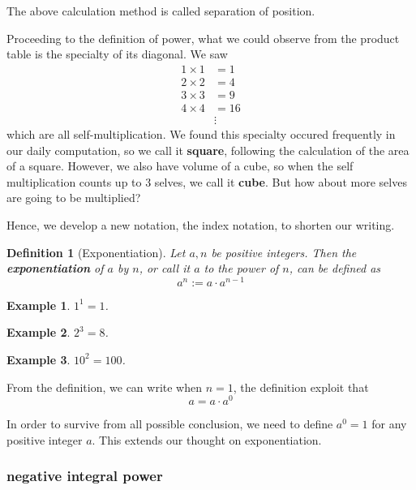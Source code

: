 \documentclass[12pt]{article}
\newtheorem{definition}{Definition}[section]
\newtheorem*{example}{Example}
\begin{document}
    The above calculation method is called separation of position.

    Proceeding to the definition of power, what we could observe from the product table is the specialty of its diagonal. We saw\begin{align*}
        1\times 1&=1\\
        2\times 2&=4\\
        3\times 3&=9\\
        4\times 4&=16\\
        &\vdots
    \end{align*} 
    which are all self-multiplication. We found this specialty occured frequently in our daily computation, so we call it \textbf{square}, following the calculation of the area of a square. However, we also have volume of a cube, so when the self multiplication counts up to 3 selves, we call it \textbf{cube}. But how about more selves are going to be multiplied?

    Hence, we develop a new notation, the index notation, to shorten our writing.

    \begin{definition}[Exponentiation]
        Let $a,n$ be positive integers. Then the \textbf{exponentiation} of $a$ by $n$, or call it $a$ to the power of $n$, can be defined as $$a^n:=a\cdot a^{n-1}$$
    \end{definition}

    \begin{example}
        $1^1=1$.
    \end{example}

    \begin{example}
        $2^3=8$.
    \end{example}

    \begin{example}
        $10^2=100$.
    \end{example}

    From the definition, we can write when $n=1$, the definition exploit that $$a=a\cdot a^0$$

    In order to survive from all possible conclusion, we need to define $a^0=1$ for any positive integer $a$. This extends our thought on exponentiation.

    \subsubsection*{negative integral power}
\end{document}
